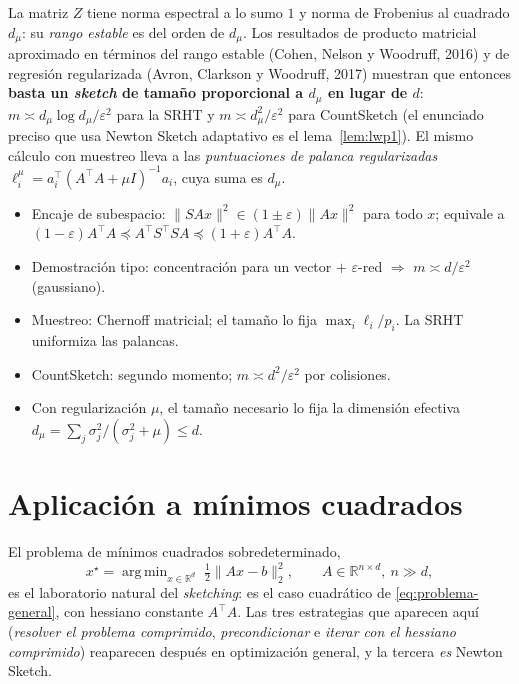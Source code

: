 \documentclass[11pt,a4paper,oneside]{book}
\theoremstyle{definition}
\theoremstyle{remark}
\newcommand{\R}{\mathbb{R}}
\newcommand{\T}{^{\top}}
\newcommand{\eps}{\varepsilon}
\newcommand{\nrm}[1]{\lVert #1\rVert}
\DeclareMathOperator*{\argmin}{arg\,min}
\newcommand{\dmu}{d_{\mu}}
\begin{document}
La matriz $Z$ tiene norma espectral a lo sumo $1$ y norma de Frobenius al cuadrado $\dmu$: su \emph{rango
estable} es del orden de $\dmu$. Los resultados de producto matricial aproximado en términos del rango
estable (Cohen, Nelson y Woodruff, 2016) y de regresión regularizada (Avron, Clarkson y Woodruff, 2017)
muestran que entonces \textbf{basta un \emph{sketch} de tamaño proporcional a $\dmu$ en lugar de $d$}:
$m\asymp\dmu\log\dmu/\eps^2$ para la SRHT y $m\asymp\dmu^2/\eps^2$ para CountSketch (el enunciado preciso
que usa Newton Sketch adaptativo es el lema~\ref{lem:lwp1}). El mismo cálculo con muestreo lleva a las
\emph{puntuaciones de palanca regularizadas} $\ell_i^{\mu}=a_i\T(A\T A+\mu I)^{-1}a_i$, cuya suma es $\dmu$.



\begin{resumen}
\begin{itemize}
  \item Encaje de subespacio: $\nrm{SAx}^2\in(1\pm\eps)\nrm{Ax}^2$ para todo $x$; equivale a $(1-\eps)A\T A\preceq A\T S\T SA\preceq(1+\eps)A\T A$.
  \item Demostración tipo: concentración para un vector $+$ $\eps$-red $\Rightarrow$ $m\asymp d/\eps^2$ (gaussiano).
  \item Muestreo: Chernoff matricial; el tamaño lo fija $\max_i\ell_i/p_i$. La SRHT uniformiza las palancas.
  \item CountSketch: segundo momento; $m\asymp d^2/\eps^2$ por colisiones.
  \item Con regularización $\mu$, el tamaño necesario lo fija la dimensión efectiva $\dmu=\sum_j\sigma_j^2/(\sigma_j^2+\mu)\le d$.
\end{itemize}
\end{resumen}

\chapter{Aplicación a mínimos cuadrados}\label{cap:ls}

El problema de mínimos cuadrados sobredeterminado,
\begin{equation}\label{eq:ls}
  x^\star=\argmin_{x\in\R^d}\;\tfrac12\nrm{Ax-b}_2^2,\qquad A\in\R^{n\times d},\ n\gg d,
\end{equation}
es el laboratorio natural del \emph{sketching}: es el caso cuadrático de \eqref{eq:problema-general}, con hessiano
constante $A\T A$. Las tres estrategias que aparecen aquí (\emph{resolver el problema comprimido},
\emph{precondicionar} e \emph{iterar con el hessiano comprimido}) reaparecen después en optimización general, y
la tercera \emph{es} Newton Sketch.
\end{document}
